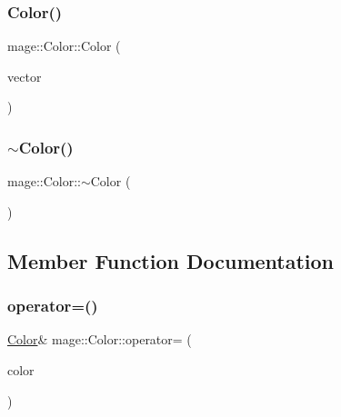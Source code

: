 \subsubsection{\texorpdfstring{Color()}{Color()}\hspace{0.1cm}{\footnotesize\ttfamily [4/4]}}
{\footnotesize\ttfamily mage\+::\+Color\+::\+Color (\begin{DoxyParamCaption}\item[{const X\+M\+F\+L\+O\+A\+T4 \&}]{vector }\end{DoxyParamCaption})\hspace{0.3cm}{\ttfamily [explicit]}}

\hypertarget{structmage_1_1_color_aa4df1c9718b7846adf77fbeed79ac219}{}\label{structmage_1_1_color_aa4df1c9718b7846adf77fbeed79ac219} 
\subsubsection{\texorpdfstring{$\sim$\+Color()}{~Color()}}
{\footnotesize\ttfamily mage\+::\+Color\+::$\sim$\+Color (\begin{DoxyParamCaption}{ }\end{DoxyParamCaption})\hspace{0.3cm}{\ttfamily [default]}}



\subsection{Member Function Documentation}
\hypertarget{structmage_1_1_color_a006c8ce9bf69e54598c5981fe79d742c}{}\label{structmage_1_1_color_a006c8ce9bf69e54598c5981fe79d742c} 
\subsubsection{\texorpdfstring{operator=()}{operator=()}}
{\footnotesize\ttfamily \hyperlink{structmage_1_1_color}{Color}\& mage\+::\+Color\+::operator= (\begin{DoxyParamCaption}\item[{const \hyperlink{structmage_1_1_color}{Color} \&}]{color }\end{DoxyParamCaption})}

